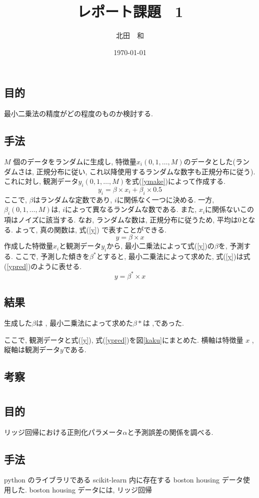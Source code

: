 \documentclass{jsarticle}
\title{レポート課題　1}
\date{\today}
\author{北田　和}
\begin{document}
\maketitle
\newpage


\section{}

\subsection{目的}
最小二乗法の精度がどの程度のものか検討する. 

\subsection{手法}
$M$ 個のデータをランダムに生成し, 特徴量$x_i(0, 1, \dots, M)$のデータとした(ランダムさは, 正規分布に従い, これ以降使用するランダムな数字も正規分布に従う). 
これに対し, 観測データ$y_i(0, 1, \dots, M)$を式(\ref{ymake})によって作成する.
\begin{equation}
\label{ymake}
y_i = \beta \times x_i + \beta_i \times 0.5
\end{equation}
ここで, $\beta$はランダムな定数であり, $i$に関係なく一つに決める. 
一方, $\beta_i(0, 1, \dots, M)$は, $i$によって異なるランダムな数である. 
また, $x_i$に関係ないこの項はノイズに該当する. 
なお, ランダムな数は, 正規分布に従うため, 平均は0となる. 
よって, 真の関数は, 式(\ref{y}) で表すことができる. 
\begin{equation}
\label{y}
y = \beta \times x
\end{equation}
作成した特徴量$x_i$と観測データ$y_i$から, 最小二乗法によって式(\ref{y})の$\beta$を, 予測する. 
ここで, 予測した傾きを$\beta^*$とすると, 最小二乗法によって求めた, 式(\ref{y})は式(\ref{ypred})のように表せる. 
\begin{equation}
\label{ypred}
y = \beta^* \times x 
\end{equation}


\subsection{結果}
生成した$\beta$は   , 
最小二乗法によって求めた$\beta *$は    ,であった. 



ここで, 観測データと式(\ref{y}), 式(\ref{ypred})を図\ref{kaku}にまとめた. 横軸は特徴量 $x$ , 縦軸は観測データ$y$である. 


\subsection{考察}






\section{}
\subsection{目的}
リッジ回帰における正則化パラメータ$\alpha$と予測誤差の関係を調べる. 

\subsection{手法}
python のライブラリである scikit-learn 内に存在する boston housing データ使用した. 
boston housing データには, リッジ回帰
\end{document}
